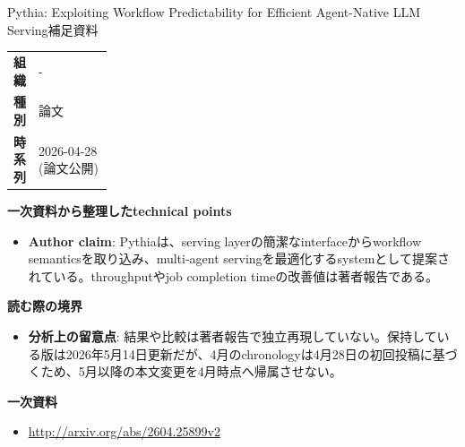 \begin{technicalnote}{Pythia: Exploiting Workflow Predictability for Efficient Agent-Native LLM Serving}{補足資料}
\begingroup
\begin{tabularx}{\linewidth}{@{}>{\bfseries}p{0.22\linewidth}X@{}}
組織 & - \\
種別 & 論文 \\
時系列 & 2026-04-28 (論文公開) \\
\end{tabularx}
\smallskip
{\bfseries 一次資料から整理したtechnical points}
\begin{itemize}[leftmargin=1.5em,itemsep=0.35em]
\item \textbf{Author claim}: Pythiaは、serving layerの簡潔なinterfaceからworkflow semanticsを取り込み、multi-agent servingを最適化するsystemとして提案されている。throughputやjob completion timeの改善値は著者報告である。
\end{itemize}
{\bfseries 読む際の境界}
\begin{itemize}[leftmargin=1.5em,itemsep=0.35em]
\item \textbf{分析上の留意点}: 結果や比較は著者報告で独立再現していない。保持している版は2026年5月14日更新だが、4月のchronologyは4月28日の初回投稿に基づくため、5月以降の本文変更を4月時点へ帰属させない。
\end{itemize}
\begin{samepage}
{\bfseries 一次資料}
\begingroup\sloppy
\begin{itemize}[leftmargin=1.5em,itemsep=0.25em]
\item {\scriptsize\url{http://arxiv.org/abs/2604.25899v2}}
\end{itemize}
\endgroup
\end{samepage}
\endgroup
\end{technicalnote}
\medskip

